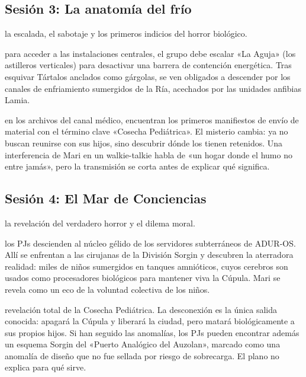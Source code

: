 \subsection{Sesión 3: La anatomía del frío}
 la escalada, el sabotaje y los primeros indicios del horror biológico.\par
{} para acceder a las instalaciones centrales, el grupo debe escalar «La Aguja» (los astilleros verticales) para desactivar una barrera de contención energética. Tras esquivar Tártalos anclados como gárgolas, se ven obligados a descender por los canales de enfriamiento sumergidos de la Ría, acechados por las unidades anfibias Lamia.\par
{} en los archivos del canal médico, encuentran los primeros manifiestos de envío de material con el término clave «Cosecha Pediátrica». El misterio cambia: ya no buscan reunirse con sus hijos, sino descubrir dónde los tienen retenidos. Una interferencia de Mari en un walkie-talkie habla de «un hogar donde el humo no entre jamás», pero la transmisión se corta antes de explicar qué significa.

\subsection{Sesión 4: El Mar de Conciencias}
 la revelación del verdadero horror y el dilema moral.\par
{} los PJs descienden al núcleo gélido de los servidores subterráneos de ADUR-OS. Allí se enfrentan a las cirujanas de la División Sorgin y descubren la aterradora realidad: miles de niños sumergidos en tanques amnióticos, cuyos cerebros son usados como procesadores biológicos para mantener viva la Cúpula. Mari se revela como un eco de la voluntad colectiva de los niños.\par
{} revelación total de la Cosecha Pediátrica. La desconexión es la única salida conocida: apagará la Cúpula y liberará la ciudad, pero matará biológicamente a sus propios hijos. Si han seguido las anomalías, los PJs pueden encontrar además un esquema Sorgin del «Puerto Analógico del Auzolan», marcado como una anomalía de diseño que no fue sellada por riesgo de sobrecarga. El plano no explica para qué sirve.

